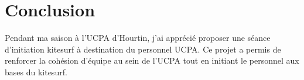 \documentclass[11pt,a4paper]{report}
\begin{document}
%                                                                        


\section{Conclusion}

Pendant ma saison à l'UCPA d'Hourtin, j'ai apprécié proposer une 
séance d'initiation kitesurf à destination du personnel UCPA.
Ce projet a permis de renforcer la cohésion d'équipe au sein de l'UCPA
tout en initiant le personnel aux bases du kitesurf. 
\end{document}
